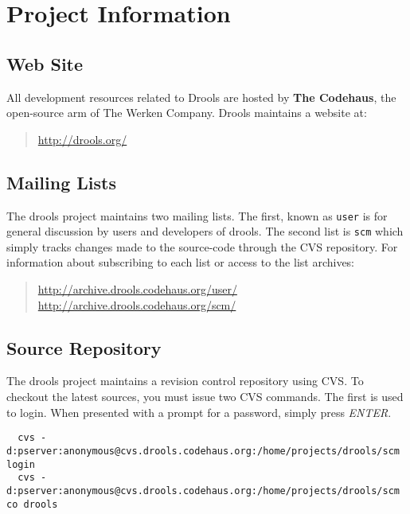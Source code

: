\chapter{Project Information}


\section{Web Site}

All development resources related to Drools are hosted by 
\textbf{The Codehaus}, the open-source 
arm of The Werken Company. Drools maintains a website at:

\begin{quote}
	\url{http://drools.org/}
\end{quote}


\section{Mailing Lists}

The drools project maintains two mailing lists.  The first, known as
\verb|user| is for general discussion by users and
developers of drools.  The second list is \verb|scm| which
simply tracks changes made to the source-code through the CVS
repository. For information about subscribing to each list or access 
to the list archives:

\begin{quote}
    \url{http://archive.drools.codehaus.org/user/}\\
    \url{http://archive.drools.codehaus.org/scm/}
\end{quote}

\section{Source Repository}

The drools project maintains a revision control repository using
CVS.  To checkout the latest sources, you must issue two CVS commands.
The first is used to login.  When presented with a prompt for a
password, simply press \emph{ENTER}.

{\small
\begin{verbatim}
  cvs -d:pserver:anonymous@cvs.drools.codehaus.org:/home/projects/drools/scm login
  cvs -d:pserver:anonymous@cvs.drools.codehaus.org:/home/projects/drools/scm co drools
\end{verbatim}
}

\clearpage

